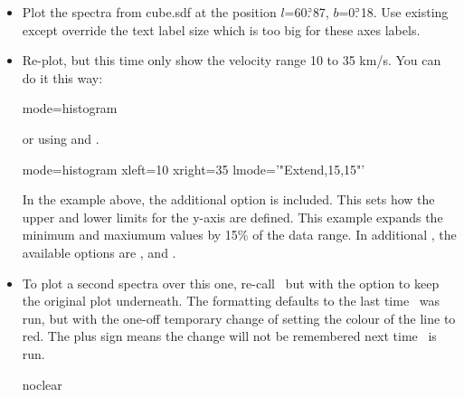 \documentclass[11pt,oneside,chapters]{starlink}
\newcommand{\dgs}{\si{\degree}}%
\newcommand{\dgs}{\HCode{&deg}}
\providecommand{\udeg}{\hspace{-0.3em}\dgs\hspace{-0.08em}}
\begin{document}
\begin{itemize}
\item Plot the spectra from cube.sdf at the position
$l$=60.$\udeg$87, $b$=0.$\udeg$18. Use existing  except
override the text label size which is too big for these axes labels.
\begin{terminalv}
\end{terminalv}


\item Re-plot, but this time only show the velocity range 10 to 35
km/s. You can do it this way:
\begin{terminalv}
  mode=histogram
\end{terminalv}
or using  and .
\begin{terminalv}
  mode=histogram xleft=10 xright=35 lmode='"Extend,15,15"'
\end{terminalv}
In the example above, the additional option  is included.
This sets how the upper and lower limits for the y-axis are defined.
This example expands the minimum and maxiumum values by 15\% of the
data range. In additional , the available options are
,  and .


\item To plot a second spectra over this one, re-call \display\ but
with the  option to keep the original plot underneath.
The formatting defaults to the last time \linplot\ was run, but with
the one-off temporary change of setting the colour of the line to red.
The plus sign means the change will not be remembered next time
\linplot\ is run.
\begin{terminalv}
  noclear
\end{terminalv}
\end{itemize}
\end{document}
